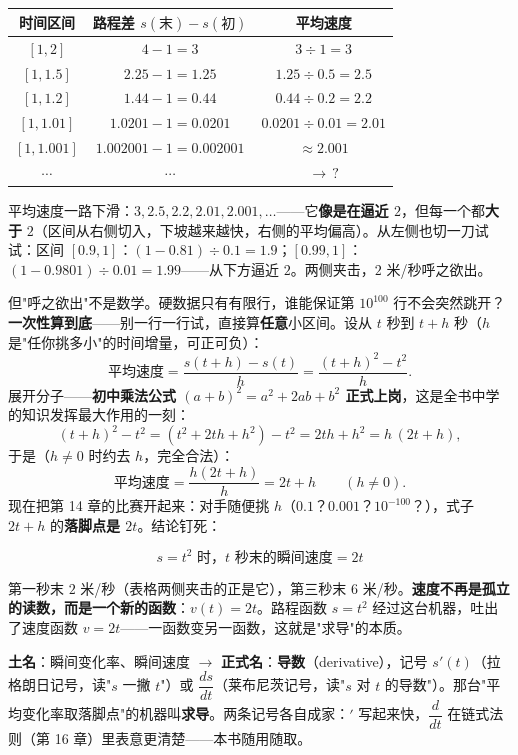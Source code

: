 \begin{center}
\begin{tabular}{ccc}
\toprule
时间区间 & 路程差 $s(\text{末}) - s(\text{初})$ & 平均速度 \\
\midrule
$[1, 2]$ & $4 - 1 = 3$ & $3 \div 1 = 3$ \\
$[1, 1.5]$ & $2.25 - 1 = 1.25$ & $1.25\div0.5 = 2.5$ \\
$[1, 1.2]$ & $1.44 - 1 = 0.44$ & $0.44 \div 0.2 = 2.2$ \\
$[1, 1.01]$ & $1.0201 - 1 = 0.0201$ & $0.0201\div0.01 = 2.01$ \\
$[1, 1.001]$ & $1.002001 - 1 = 0.002001$ & $\approx 2.001$ \\
$\cdots$ & $\cdots$ & $\to\, ?$ \\
\bottomrule
\end{tabular}
\end{center}

平均速度一路下滑：$3, 2.5, 2.2, 2.01, 2.001, \dots$——它\textbf{像是在逼近 $2$}，但每一个都\textbf{大于} $2$（区间从右侧切入，下坡越来越快，右侧的平均偏高）。从左侧也切一刀试试：区间 $[0.9, 1]$：$(1 - 0.81)\div0.1 = 1.9$；$[0.99, 1]$：$(1 - 0.9801)\div 0.01 = 1.99$——从下方逼近 $2$。两侧夹击，$2$ 米/秒呼之欲出。

但"呼之欲出"不是数学。硬数据只有有限行，谁能保证第 $10^{100}$ 行不会突然跳开？\textbf{一次性算到底}——别一行一行试，直接算\textbf{任意}小区间。设从 $t$ 秒到 $t+h$ 秒（$h$ 是"任你挑多小"的时间增量，可正可负）：
\[
\text{平均速度} = \frac{s(t+h) - s(t)}{h} = \frac{(t+h)^2 - t^2}{h} .
\]
展开分子——\textbf{初中乘法公式 $(a+b)^2 = a^2 + 2ab + b^2$ 正式上岗}，这是全书中学的知识发挥最大作用的一刻：
\[
(t+h)^2 - t^2 = \left(t^2 + 2th + h^2\right) - t^2 = 2th + h^2 = h\,(2t + h),
\]
于是（$h\ne0$ 时约去 $h$，完全合法）：
\[
\text{平均速度} = \frac{h(2t+h)}{h} = 2t + h \qquad (h \ne 0).
\]
现在把第 14 章的比赛开起来：对手随便挑 $h$（$0.1$？$0.001$？$10^{-100}$？），式子 $2t + h$ 的\textbf{落脚点是 $2t$}。结论钉死：

\[
\boxed{\;s = t^2 \text{ 时，} t \text{ 秒末的瞬间速度} = 2t\;}
\]

第一秒末 $2$ 米/秒（表格两侧夹击的正是它），第三秒末 $6$ 米/秒。\textbf{速度不再是孤立的读数，而是一个新的函数}：$v(t) = 2t$。路程函数 $s = t^2$ 经过这台机器，吐出了速度函数 $v = 2t$——一函数变另一函数，这就是"求导"的本质。

\begin{faming}
\textbf{土名}：瞬间变化率、瞬间速度 $\to$ \textbf{正式名}：\textbf{导数}（derivative），记号 $s'(t)$（拉格朗日记号，读"$s$ 一撇 $t$"）或 $\dfrac{ds}{dt}$（莱布尼茨记号，读"$s$ 对 $t$ 的导数"）。那台"平均变化率取落脚点"的机器叫\textbf{求导}。两条记号各自成家：$'$ 写起来快，$\dfrac{d}{dt}$ 在链式法则（第 16 章）里表意更清楚——本书随用随取。
\end{faming}

